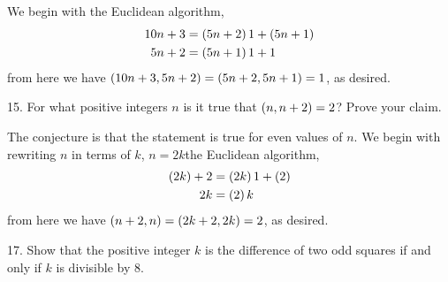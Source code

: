 \begin{mdframed}[style=darkAnswer,frametitle={Joe Starr}]
We begin with the Euclidean algorithm, 
\begin{align*}
    10n+3&=\left(5n+2\right)1+\left(5n+1\right)\\
    5n+2&=\left(5n+1\right)1+1\\
\end{align*}
from here we have $\left(10n+3,5n+2\right)=\left(5n+2,5n+1\right)=1$, as desired.
\end{mdframed}
\newpage
\begin{mdframed}[style=darkQuesion]
15.  For what positive integers $n$ is it true that $\left(n,n+2\right)=2$? Prove your
claim.
\end{mdframed}

\begin{mdframed}[style=darkAnswer,frametitle={Joe Starr}]
The conjecture is that the statement is true for even values of $n$.
We begin with rewriting $n$ in terms of $k$, $n=2k$the Euclidean algorithm, 
\begin{align*}
    \left(2k\right)+2&=\left(2k\right)1+\left(2\right)\\
    2k&=\left(2\right){k}\\
\end{align*}
from here we have $\left(n+2,n\right)=\left(2k+2,2k\right)=2$, as desired.
\end{mdframed}
\newpage
\begin{mdframed}[style=darkQuesion]
17.  Show that the positive integer $k$ is the difference of two odd squares if 
and only if $k$ is divisible by $8$.
\end{mdframed}

